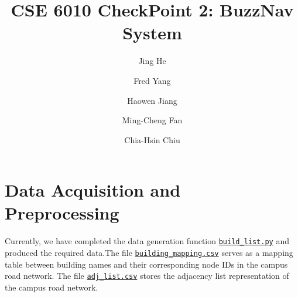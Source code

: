 \documentclass[fleqn,10pt]{olplainarticle}
\title{CSE 6010 CheckPoint 2: BuzzNav System}
\author[1]{Jing He}
\author[1]{Fred Yang}
\author[1]{Haowen Jiang}
\author[1]{Ming-Cheng Fan}
\author[1]{Chia-Hsin Chiu}
\affil{Georgia Institute of Technology}
\begin{document}
\flushbottom
\maketitle



\section*{Data Acquisition and Preprocessing}
Currently, we have completed the data generation function
\href{https://github.com/fredkyang/cse6010-buzznav/blob/main/data/build_list.py}{\texttt{build\_list.py}} and produced the required data.The file \href{https://github.com/fredkyang/cse6010-buzznav/blob/main/data/building_mapping.csv}{\texttt{building\_mapping.csv}} serves as a mapping table between building names and their corresponding node IDs in the campus road network. The file \href{https://github.com/fredkyang/cse6010-buzznav/blob/main/data/adj_list.csv}{\texttt{adj\_list.csv}} stores the adjacency list representation of the campus road network.
\end{document}
